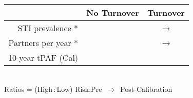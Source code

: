 \newcommand{\cell}[2]{\liningfigures{\out{\mix/#1-#2}}}
\newcommand{\fit}[3]{
  \ifdim#3pt=1pt\textbc{\cell{#1r}{#2}}\else{\cell{#1r}{#2}}\fi
  ~$\rightarrow$~%
  \ifdim#3pt=2pt\textbc{\cell{#1f}{#2}}\else{\cell{#1f}{#2}}\fi
}
{\footnotesize
\begin{tabular}{rcc}
	\toprule
                        & \textbf{No Turnover}                  &         \textbf{Turnover} \\
	\toprule
       STI prevalence * & \visible<+->{\fit{n}{pr}{1}           &           \fit{t}{pr}{1}} \\
	\midrule
	  Partners per year * & \visible<+->{\fit{n}{Cr}{2}           &           \fit{t}{Cr}{2}} \\
	\midrule
  	 10-year tPAF (Cal) & \visible<+->{\textbc{\cell{nf}{tpaf}} & \textbc{\cell{tf}{tpaf}}} \\
	\bottomrule
\end{tabular}}\\[0.5em]
{\scriptsize* Ratios = (High\,:\,Low) Risk;\enspace Pre~$\rightarrow$~Post-Calibration}